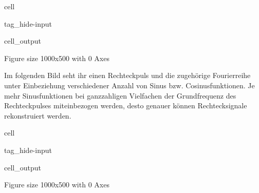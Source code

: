 \documentclass[letterpaper,10pt,english]{jupyterBook}
\begin{document}
\begin{sphinxuseclass}{cell}
\begin{sphinxuseclass}{tag_hide-input}\begin{sphinxVerbatimOutput}

\begin{sphinxuseclass}{cell_output}
\begin{sphinxVerbatim}[commandchars=\\\{\}]
\PYGZlt{}Figure size 1000x500 with 0 Axes\PYGZgt{}
\end{sphinxVerbatim}

\noindent{}

\end{sphinxuseclass}\end{sphinxVerbatimOutput}

\end{sphinxuseclass}
\end{sphinxuseclass}
\sphinxAtStartPar
Im folgenden Bild seht ihr einen Rechteckpuls und die zugehörige Fourierreihe unter Einbeziehung verschiedener Anzahl von Sinus\sphinxhyphen{} bzw. Cosinusfunktionen. Je mehr Sinusfunktionen bei ganzzahligen Vielfachen der Grundfrequenz des Rechteckpulses miteinbezogen werden, desto genauer können Rechtecksignale rekonstruiert werden.

\begin{sphinxuseclass}{cell}
\begin{sphinxuseclass}{tag_hide-input}\begin{sphinxVerbatimOutput}

\begin{sphinxuseclass}{cell_output}
\begin{sphinxVerbatim}[commandchars=\\\{\}]
\PYGZlt{}Figure size 1000x500 with 0 Axes\PYGZgt{}
\end{sphinxVerbatim}

\noindent{}

\end{sphinxuseclass}\end{sphinxVerbatimOutput}

\end{sphinxuseclass}
\end{sphinxuseclass}
\end{document}
